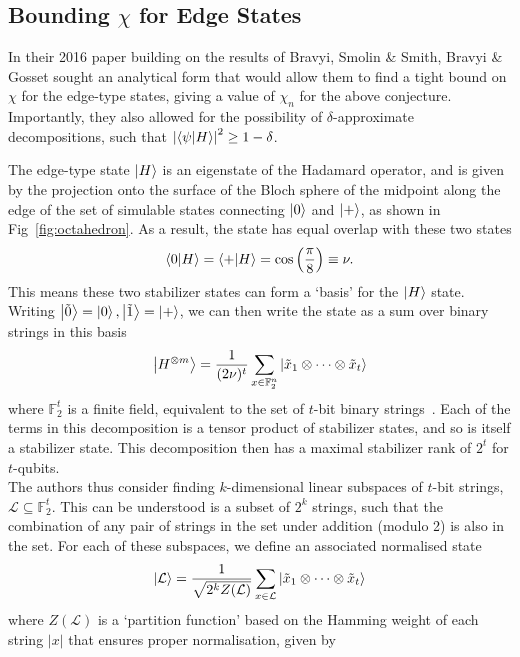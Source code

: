 \documentclass{standalone}
\begin{document}
\subsection{Bounding $\chi$ for Edge States}\label{sec:edgebound}
In their 2016 paper building on the results of Bravyi, Smolin \& Smith, Bravyi \& Gosset sought an analytical form that would allow them to find a tight bound on $\chi$ for the edge-type states, giving a value of $\chi_{n}$ for the above conjecture. Importantly, they also allowed for the possibility of $\delta$-approximate decompositions, such that $\left|\braket{\psi}{H}\right|^{2}\geq 1-\delta$. 
\par
The edge-type state $\ket{H}$ is an eigenstate of the Hadamard operator, and is given by the projection onto the surface of the Bloch sphere of the midpoint along the edge of the set of simulable states connecting $\ket{0}$ and $\ket{+}$, as shown in Fig~\ref{fig:octahedron}. As a result, the state has equal overlap with these two states 
\[\braket{0}{H}=\braket{+}{H}=\cos\left(\frac{\pi}{8}\right)\equiv \nu.\]
This means these two stabilizer states can form a `basis' for the $\ket{H}$ state. Writing $\ket{\tilde{0}}=\ket{0},\ket{\tilde{1}}=\ket{+}$, we can then write the state as a sum over binary strings in this basis
\begin{equation}
  \label{eq:hstrings}
  \ket{H^{\otimes m}}=\frac{1}{(2\nu)^{t}}\sum_{x\in\mathbb{F}_{2}^{n}}\ket{\tilde{x}_{1}\otimes\cdots\otimes\tilde{x}_{t}}
\end{equation}
where $\mathbb{F}_{2}^{t}$ is a finite field, equivalent to the set of $t$-bit binary strings~\cite{Bravyi2016b}. Each of the terms in this decomposition is a tensor product of stabilizer states, and so is itself a stabilizer state. This decomposition then has a maximal stabilizer rank of $2^{t}$ for $t$-qubits.\\
The authors thus consider finding $k$-dimensional linear subspaces of $t$-bit strings, $\mathcal{L}\subseteq\mathbb{F}_{2}^{t}$. This can be understood is a subset of $2^{k}$ strings, such that the combination of any pair of strings in the set under addition (modulo 2) is also in the set. For each of these subspaces, we define an associated normalised state~\cite{Bravyi2016b} 
\begin{equation}
  \label{eq:Hsubspaces}
  \ket{\mathcal{L}}=\frac{1}{\sqrt{2^{k}Z(\mathcal{L})}}\sum_{x\in\mathcal{L}}\ket{\tilde{x}_{1}\otimes\cdots\otimes\tilde{x}_{t}}
\end{equation}
where $Z(\mathcal{L})$ is a `partition function' based on the Hamming weight of each string $\vert x\vert$ that ensures proper normalisation, given by~\cite{Bravyi2016b}
\end{document}
